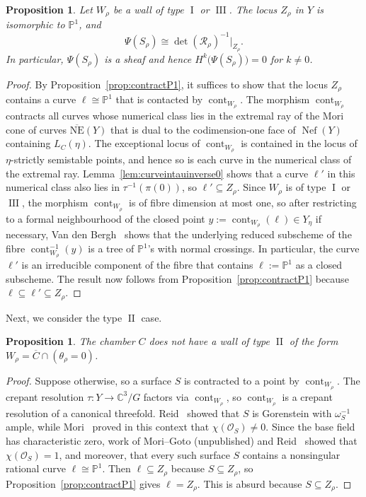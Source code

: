 \documentclass[11pt,reqno]{amsart}
\numberwithin{equation}{section}
\newtheorem{proposition}[theorem]{Proposition}
\theoremstyle{definition}
\newcommand{\cont}{\operatorname{cont}}
\newcommand{\0}{\operatorname{0}}
\newcommand{\I}{\operatorname{I}}
\newcommand{\II}{\operatorname{II}}
\newcommand{\III}{\operatorname{III}}
\newcommand{\Nef}{\operatorname{Nef}}
\begin{document}
\begin{proposition}
\label{prop:typeIorIII}
  Let $W_\rho$ be a wall of type $\I$ or $\III$. 
  The locus $Z_\rho$ in $Y$ is isomorphic to $\mathbb{P}^1$, and
  \[
 \Psi(S_\rho) \cong \det(\mathcal{R}_\rho)^{-1}\vert_{Z_\rho}.
 \]
 In particular, $\Psi(S_\rho)$ is a sheaf and hence $H^k\big(\Psi(S_\rho)\big)=0$ for $k\neq 0$.
 \end{proposition}
 \begin{proof}
  By Proposition~\ref{prop:contractP1}, it suffices to show that the locus $Z_\rho$ contains a curve $\ell\cong \mathbb{P}^1$ that is contacted by $\cont_{W_\rho}$. The morphism $\cont_{W_\rho}$ contracts all curves whose numerical class lies in the extremal ray of the Mori cone of curves $\overline{\text{NE}}(Y)$ that is dual to the codimension-one face of $\Nef(Y)$ containing $L_C(\eta)$. The exceptional locus of $\cont_{W_\rho}$ is contained in the locus of $\eta$-strictly semistable points, and hence so is each curve in the numerical class of the extremal ray. Lemma~\ref{lem:curveintauinverse0} shows that a curve $\ell'$ in this numerical class also lies in $\tau^{-1}(\pi(0))$, so $\ell'\subseteq Z_\rho$. Since $W_\rho$ is of type $\I$ or $\III$, the morphism $\cont_{W_\rho}$ is of fibre dimension at most one,
  so after restricting to a formal neighbourhood of the closed point $y:=\cont_{W_\rho}(\ell)\in Y_\eta$ if necessary, Van den Bergh~\cite[Lemma 3.4.1]{VdB04Duke} shows that the underlying reduced subscheme of the fibre $\cont_{W_\rho}^{-1}(y)$ is a tree of $\mathbb{P}^1$'s with normal crossings. In particular, the curve $\ell'$ is an irreducible component of the fibre that contains $\ell:=\mathbb{P}^1$ as a closed subscheme. The result now follows from Proposition~\ref{prop:contractP1} because $\ell\subseteq \ell'\subseteq Z_\rho$. 
 \end{proof}


 Next, we consider the type $\II$ case.
 
 \begin{proposition}
 \label{prop:notypeII}
 The chamber $C$ does not have a wall of type $\II$ of the form $W_\rho=\overline{C}\cap(\theta_\rho=0)$.
 \end{proposition}
 \begin{proof}
 Suppose otherwise, so a surface $S$ is contracted to a point by $\cont_{W_\rho}$. The crepant resolution $\tau\colon Y\to \mathbb{C}^3/G$ factors via $\cont_{W_\rho}$, so $\cont_{W_\rho}$ is a crepant resolution of a canonical threefold.  Reid~\cite{Reid79} showed that $S$ is Gorenstein with $\omega_S^{-1}$ ample, while Mori~\cite[(3.35)]{Mori82} proved in this context that $\chi(\mathcal{O}_S)\neq 0$. Since the base field has characteristic zero, work of Mori--Goto (unpublished) and Reid~\cite[Proof of Corollary~4.10(I)]{Reid94}
 showed that $\chi(\mathcal{O}_S)=1$, and moreover, that every such surface $S$ contains a nonsingular rational curve $\ell\cong \mathbb{P}^1$. Then $\ell\subseteq Z_\rho$ because $S\subseteq Z_\rho$, so Proposition~\ref{prop:contractP1} gives $\ell=Z_\rho$. This is absurd because $S\subseteq Z_\rho$.
 \end{proof}
 
\end{document}
